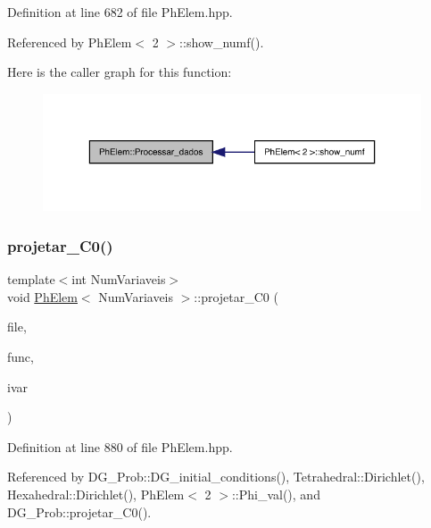 Definition at line 682 of file Ph\+Elem.\+hpp.



Referenced by Ph\+Elem$<$ 2 $>$\+::show\+\_\+numf().

Here is the caller graph for this function\+:
\nopagebreak
\begin{figure}[H]
\begin{center}
\leavevmode
\includegraphics[width=323pt]{classPhElem_a6e4284fcb95240394293c1a576deb738_icgraph}
\end{center}
\end{figure}
\mbox{\label{classPhElem_aa5f168531640b2fb9ac82f85e5f8b11a}} 
\subsubsection{\texorpdfstring{projetar\+\_\+\+C0()}{projetar\_C0()}}
{\footnotesize\ttfamily template$<$int Num\+Variaveis$>$ \\
void \hyperlink{classPhElem}{Ph\+Elem}$<$ Num\+Variaveis $>$\+::projetar\+\_\+\+C0 (\begin{DoxyParamCaption}\item[{F\+I\+LE $\ast$}]{file,  }\item[{double($\ast$)(double, double, double)}]{func,  }\item[{const int \&}]{ivar }\end{DoxyParamCaption})}



Definition at line 880 of file Ph\+Elem.\+hpp.



Referenced by D\+G\+\_\+\+Prob\+::\+D\+G\+\_\+initial\+\_\+conditions(), Tetrahedral\+::\+Dirichlet(), Hexahedral\+::\+Dirichlet(), Ph\+Elem$<$ 2 $>$\+::\+Phi\+\_\+val(), and D\+G\+\_\+\+Prob\+::projetar\+\_\+\+C0().

